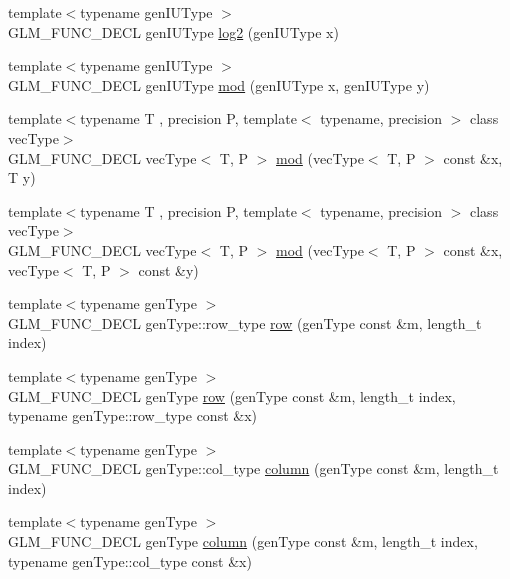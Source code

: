 \begin{DoxyCompactItemize}
\item 
{\footnotesize template$<$typename gen\+I\+U\+Type $>$ }\\G\+L\+M\+\_\+\+F\+U\+N\+C\+\_\+\+D\+E\+C\+L gen\+I\+U\+Type \hyperlink{group__gtc__integer_ga9bd682e74bfacb005c735305207ec417}{log2} (gen\+I\+U\+Type x)
\item 
{\footnotesize template$<$typename gen\+I\+U\+Type $>$ }\\G\+L\+M\+\_\+\+F\+U\+N\+C\+\_\+\+D\+E\+C\+L gen\+I\+U\+Type \hyperlink{group__gtc__integer_ga75c6fd2a143fc44e5f7b871abad539e0}{mod} (gen\+I\+U\+Type x, gen\+I\+U\+Type y)
\item 
{\footnotesize template$<$typename T , precision P, template$<$ typename, precision $>$ class vec\+Type$>$ }\\G\+L\+M\+\_\+\+F\+U\+N\+C\+\_\+\+D\+E\+C\+L vec\+Type$<$ T, P $>$ \hyperlink{group__gtc__integer_ga35e7133a920e63775739ebb491e0c2c8}{mod} (vec\+Type$<$ T, P $>$ const \&x, T y)
\item 
{\footnotesize template$<$typename T , precision P, template$<$ typename, precision $>$ class vec\+Type$>$ }\\G\+L\+M\+\_\+\+F\+U\+N\+C\+\_\+\+D\+E\+C\+L vec\+Type$<$ T, P $>$ \hyperlink{group__gtc__integer_ga09617ccfdc105bc1c3477105d84f2e00}{mod} (vec\+Type$<$ T, P $>$ const \&x, vec\+Type$<$ T, P $>$ const \&y)
\item 
{\footnotesize template$<$typename gen\+Type $>$ }\\G\+L\+M\+\_\+\+F\+U\+N\+C\+\_\+\+D\+E\+C\+L gen\+Type\+::row\+\_\+type \hyperlink{group__gtc__matrix__access_ga259e5ebd0f31ec3f83440f8cae7f5dba}{row} (gen\+Type const \&m, length\+\_\+t index)
\item 
{\footnotesize template$<$typename gen\+Type $>$ }\\G\+L\+M\+\_\+\+F\+U\+N\+C\+\_\+\+D\+E\+C\+L gen\+Type \hyperlink{group__gtc__matrix__access_gaadcc64829aadf4103477679e48c7594f}{row} (gen\+Type const \&m, length\+\_\+t index, typename gen\+Type\+::row\+\_\+type const \&x)
\item 
{\footnotesize template$<$typename gen\+Type $>$ }\\G\+L\+M\+\_\+\+F\+U\+N\+C\+\_\+\+D\+E\+C\+L gen\+Type\+::col\+\_\+type \hyperlink{group__gtc__matrix__access_ga96022eb0d3fae39d89fc7a954e59b374}{column} (gen\+Type const \&m, length\+\_\+t index)
\item 
{\footnotesize template$<$typename gen\+Type $>$ }\\G\+L\+M\+\_\+\+F\+U\+N\+C\+\_\+\+D\+E\+C\+L gen\+Type \hyperlink{group__gtc__matrix__access_ga9e757377523890e8b80c5843dbe4dd15}{column} (gen\+Type const \&m, length\+\_\+t index, typename gen\+Type\+::col\+\_\+type const \&x)

\end{DoxyCompactItemize}
